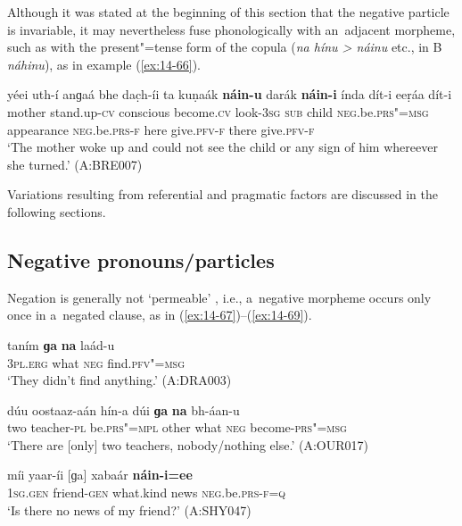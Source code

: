 Although it was stated at the beginning of this section that the negative particle is invariable, it may nevertheless fuse phonologically with an~adjacent morpheme, such as with the present"=tense form of the copula (\textit{na hínu {\textgreater} náinu} etc., in B \textit{náhinu}), as in example (\ref{ex:14-66}).
\begin{exe}
\ex
\label{ex:14-66}
\gll yéei uth-í anɡaá bhe dac̣h-íi ta kuṇaák \textbf{náin-u} darák \textbf{náin-i} índa dít-i eeṛáa dít-i \\
mother stand.up-\textsc{cv} conscious become.\textsc{cv} look-\textsc{3sg}  \textsc{sub} child \textsc{neg.}be.\textsc{prs"=msg} appearance \textsc{neg.}be.\textsc{prs-f}  here give.\textsc{pfv-f} there give.\textsc{pfv-f} \\
\glt `The mother woke up and could not see the child or any sign of him whereever she turned.' (A:BRE007)
\end{exe}

Variations resulting from referential and pragmatic factors are discussed in the following sections.


\subsection{Negative pronouns/particles}
\label{subsec:14-3-2}

Negation is generally not `permeable' \citep[563]{ramat2006}, i.e., a~negative morpheme occurs only once in a~negated clause, as in (\ref{ex:14-67})--(\ref{ex:14-69}).

\begin{exe}
\ex
\label{ex:14-67}
\gll taním \textbf{ɡa} \textbf{na} laád-u \\
\textsc{3pl.erg} what \textsc{neg} find.\textsc{pfv"=msg}  \\
\glt `They didn't find anything.' (A:DRA003)

\ex
\label{ex:14-68}
\gll dúu oostaaz-aán hín-a dúi \textbf{ɡa} \textbf{na}  bh-áan-u \\
two teacher-\textsc{pl} be.\textsc{prs"=mpl} other what \textsc{neg}  become-\textsc{prs"=msg} \\
\glt `There are [only] two teachers, nobody/nothing else.' (A:OUR017)

\ex
\label{ex:14-69}
\gll míi yaar-íi [ɡa] xabaár \textbf{náin-i=ee} \\
\textsc{1sg.gen} friend-\textsc{gen} what.kind news \textsc{neg}.be.\textsc{prs-f=q}  \\
\glt `Is there no news of my friend?' (A:SHY047)
\end{exe}

